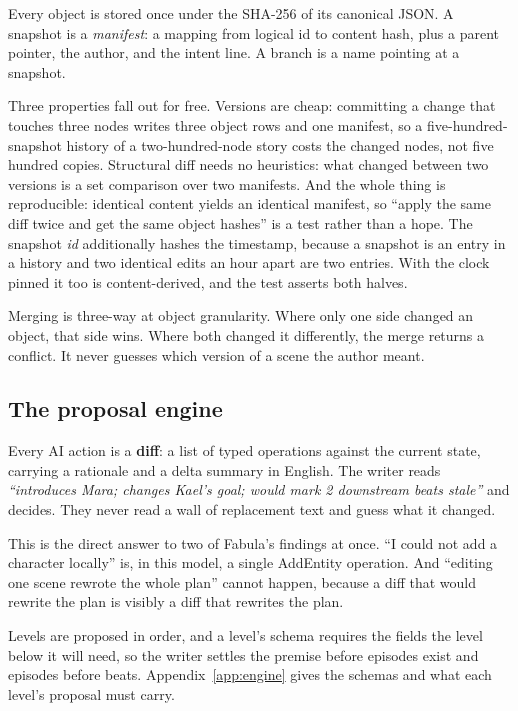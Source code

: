\documentclass{article}
\begin{document}
Every object is stored once under the SHA-256 of its canonical JSON. A snapshot is a
\emph{manifest}: a mapping from logical id to content hash, plus a parent pointer, the
author, and the intent line. A branch is a name pointing at a snapshot.

Three properties fall out for free. Versions are cheap: committing a change that touches
three nodes writes three object rows and one manifest, so a five-hundred-snapshot history
of a two-hundred-node story costs the changed nodes, not five hundred copies. Structural
diff needs no heuristics: what changed between two versions is a set comparison over two
manifests. And the whole thing is reproducible: identical content yields an identical
manifest, so ``apply the same diff twice and get the same object hashes'' is a test rather
than a hope. The snapshot \emph{id} additionally hashes the timestamp, because a snapshot is
an entry in a history and two identical edits an hour apart are two entries. With the
clock pinned it too is content-derived, and the test asserts both halves.

Merging is three-way at object granularity. Where only one side changed an object, that
side wins. Where both changed it differently, the merge returns a conflict. It never
guesses which version of a scene the author meant.


\subsection{The proposal engine}

Every AI action is a \textbf{diff}: a list of typed operations against the current state,
carrying a rationale and a delta summary in English. The writer reads \emph{``introduces
Mara; changes Kael's goal; would mark 2 downstream beats stale''} and decides. They never
read a wall of replacement text and guess what it changed.

This is the direct answer to two of Fabula's findings at once. ``I could not add a
character locally'' is, in this model, a single \textsf{AddEntity} operation. And
``editing one scene rewrote the whole plan'' cannot happen, because a diff that would
rewrite the plan is visibly a diff that rewrites the plan.


Levels are proposed in order, and a level's schema requires the fields the level below it
will need, so the writer settles the premise before episodes exist and episodes before
beats. Appendix~\ref{app:engine} gives the schemas and what each level's proposal must
carry.
\end{document}
